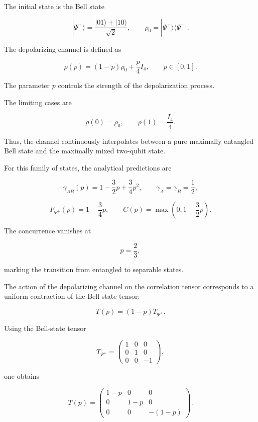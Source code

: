 The initial state is the Bell state

\[
|\Psi^+\rangle
=
\frac{|01\rangle + |10\rangle}{\sqrt{2}},
\qquad
\rho_0
=
|\Psi^+\rangle
\langle\Psi^+|.
\]

The depolarizing channel is defined as

\begin{equation}
\rho(p)
=
(1-p)\rho_0
+
\frac{p}{4}I_4,
\qquad
p \in [0,1].
\label{eq:depolarizing_channel_experiment}
\end{equation}

The parameter \(p\) controls the strength of the depolarization process.

The limiting cases are

\[
\rho(0)
=
\rho_0,
\qquad
\rho(1)
=
\frac{I_4}{4}.
\]

Thus, the channel continuously interpolates between a pure maximally entangled Bell state and the maximally mixed two-qubit state.

\medskip

For this family of states, the analytical predictions are

\[
\gamma_{AB}(p)
=
1
-
\frac{3}{2}p
+
\frac{3}{4}p^2,
\qquad
\gamma_A
=
\gamma_B
=
\frac{1}{2},
\]

\[
F_{\Psi^+}(p)
=
1
-
\frac{3}{4}p,
\qquad
C(p)
=
\max
\left(
0,
1-\frac{3}{2}p
\right).
\]

The concurrence vanishes at

\[
p
=
\frac{2}{3},
\]

marking the transition from entangled to separable states.

\medskip

The action of the depolarizing channel on the correlation tensor corresponds to a uniform contraction of the Bell-state tensor:

\[
T(p)
=
(1-p)
T_{\Psi^+}.
\]

Using the Bell-state tensor

\[
T_{\Psi^+}
=
\begin{pmatrix}
1 & 0 & 0 \\
0 & 1 & 0 \\
0 & 0 & -1
\end{pmatrix},
\]

one obtains

\begin{equation}
T(p)
=
\begin{pmatrix}
1-p & 0 & 0 \\
0 & 1-p & 0 \\
0 & 0 & -(1-p)
\end{pmatrix}.
\label{eq:depolarizing_tensor}
\end{equation}

